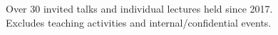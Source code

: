 \newcommand{\talkref}[4]{``#3'' (#2).\\\textit{#4}}
\newcommand{\talkrefwnote}[5]{``#3'' (#2).\\\textit{#4, (#5)}}

\ifdefined\shortcv
    {
        \hspace*{\fill} Over 30 invited talks and individual lectures held since 2017.\\
        \hspace*{\fill} Excludes teaching activities and internal/confidential events.
    }
\else
    {
        
        
    }
\fi


